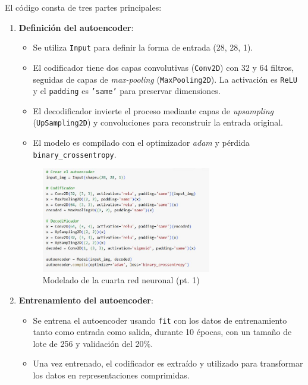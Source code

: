 El código consta de tres partes principales:
\begin{enumerate}
	\item \textbf{Definición del autoencoder}:
	\begin{itemize}
		\item Se utiliza \texttt{Input} para definir la forma de entrada (28, 28, 1).
		\item El codificador tiene dos capas convolutivas (\texttt{Conv2D}) con 32 y 64 filtros, seguidas de capas de \textit{max-pooling} (\texttt{MaxPooling2D}). La activación es \texttt{ReLU} y el \texttt{padding} es \texttt{'same'} para preservar dimensiones.
		\item El decodificador invierte el proceso mediante capas de \textit{upsampling} (\texttt{UpSampling2D}) y convoluciones para reconstruir la entrada original.
		\item El modelo es compilado con el optimizador \textit{adam} y pérdida \texttt{binary\_crossentropy}.
	\end{itemize}
	
	\begin{figure}[H]
		\centering
		\includegraphics[width=0.7\textwidth]{imgs/model-1-red4.JPG}
		\caption{Modelado de la cuarta red neuronal (pt. 1)}
		\label{fig:model-1-red4}
	\end{figure}
	
	\item \textbf{Entrenamiento del autoencoder}:
	\begin{itemize}
		\item Se entrena el autoencoder usando \texttt{fit} con los datos de entrenamiento tanto como entrada como salida, durante 10 épocas, con un tamaño de lote de 256 y validación del 20\%.
		\item Una vez entrenado, el codificador es extraído y utilizado para transformar los datos en representaciones comprimidas.
	\end{itemize}
	

\end{enumerate}
